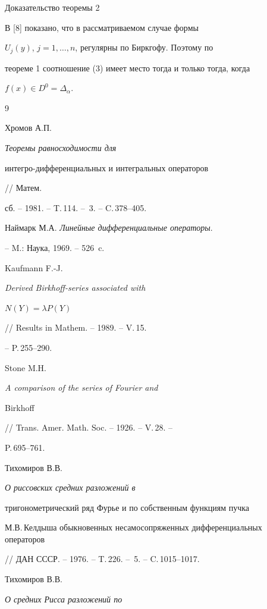 \begin{pf*}{Доказательство теоремы 2}


В [8] показано, что в рассматриваемом случае формы


$U_j(y)$, $j=1,\dotsc,n$, регулярны по Биркгофу. Поэтому по


теореме 1 соотношение (3) имеет место тогда и только тогда, когда


$f(x)\in D^0 =\Delta_\alpha$.


\end{pf*}





\begin{thebibliography}{9}







Хромов А.П. {\it Теоремы равносходимости для


интегро-дифференциальных и интегральных операторов} // Матем.


сб. -- 1981. -- T.\,114. -- \No\,3. -- C.\,378--405.




Наймарк М.А. {\it Линейные дифференциальные операторы}.


-- M.: Наука, 1969. -- 526~c.




Kaufmann F.-J. {\it Derived Birkhoff-series associated with


$N(Y)=\lambda P(Y)$} // Results in Mathem. -- 1989. -- V.\,15.


-- P.\,255--290.




Stone M.H. {\it A comparison of the series of Fourier and


Birkhoff} // Trans. Amer. Math. Soc. -- 1926. -- V.\,28. --


P.\,695--761.




Тихомиров В.В. {\it О риссовских средних разложений в


тригонометрический ряд Фурье и по собственным функциям пучка


М.В.\,Келдыша обыкновенных несамосопряженных дифференциальных операторов}


// ДАН СССР. -- 1976. -- T.\,226. -- \No\,5. -- C.\,1015--1017.




Тихомиров В.В. {\it О средних Рисса разложений по


}
\end{thebibliography}
